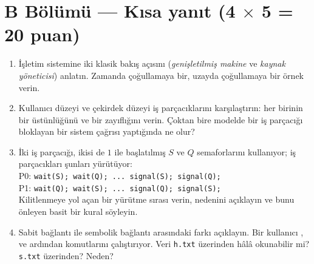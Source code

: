 \section*{B Bölümü --- Kısa yanıt \hfill (4 $\times$ 5 = 20 puan)}
\begin{enumerate}[leftmargin=2.0em,label=B\arabic*.,itemsep=0.3em]
  \item İşletim sistemine iki klasik bakış açısını (\emph{genişletilmiş makine} ve \emph{kaynak yöneticisi}) anlatın. Zamanda çoğullamaya bir, uzayda çoğullamaya bir örnek verin. 
  \ans{2.7cm}
  \item Kullanıcı düzeyi ve çekirdek düzeyi iş parçacıklarını karşılaştırın: her birinin bir üstünlüğünü ve bir zayıflığını verin. Çoktan bire modelde bir iş parçacığı bloklayan bir sistem çağrısı yaptığında ne olur? 
  \ans{2.7cm}
  \item İki iş parçacığı, ikisi de $1$ ile başlatılmış $S$ ve $Q$ semaforlarını kullanıyor; iş parçacıkları şunları yürütüyor:\\[0.2em]
  \hspace*{1em}P0: \texttt{wait(S); wait(Q); ... signal(S); signal(Q);}\\
  \hspace*{1em}P1: \texttt{wait(Q); wait(S); ... signal(Q); signal(S);}\\[0.2em]
  Kilitlenmeye yol açan bir yürütme sırası verin, nedenini açıklayın ve bunu önleyen basit bir kural söyleyin. 
  \ans{2.7cm}
  \item Sabit bağlantı ile sembolik bağlantı arasındaki farkı açıklayın. Bir kullanıcı ,  ve ardından  komutlarını çalıştırıyor. Veri \texttt{h.txt} üzerinden hâlâ okunabilir mi? \texttt{s.txt} üzerinden? Neden? 
  \ans{2.7cm}
\end{enumerate}

\newpage
